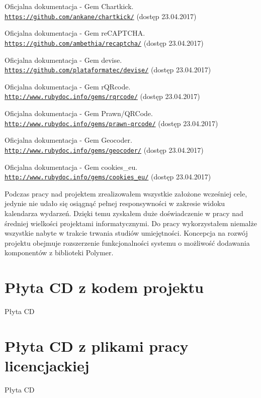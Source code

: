 \documentclass[openright]{xmgr}
\begin{document}
\begin{thebibliography}{9}
Oficjalna dokumentacja - Gem Chartkick.
\\\texttt{\url{https://github.com/ankane/chartkick/}} (dostęp 23.04.2017)

Oficjalna dokumentacja - Gem reCAPTCHA.
\\\texttt{\url{https://github.com/ambethia/recaptcha/}} (dostęp 23.04.2017)

Oficjalna dokumentacja - Gem devise.
\\\texttt{\url{https://github.com/plataformatec/devise/}} (dostęp 23.04.2017)

Oficjalna dokumentacja - Gem rQRcode.
\\\texttt{\url{http://www.rubydoc.info/gems/rqrcode/}} (dostęp 23.04.2017)

Oficjalna dokumentacja - Gem Prawn/QRCode.
\\\texttt{\url{http://www.rubydoc.info/gems/prawn-qrcode/}} (dostęp 23.04.2017)

Oficjalna dokumentacja - Gem Geocoder.
\\\texttt{\url{http://www.rubydoc.info/gems/geocoder/}} (dostęp 23.04.2017)

Oficjalna dokumentacja - Gem cookies\_eu.
\\\texttt{\url{http://www.rubydoc.info/gems/cookies_eu/}} (dostęp 23.04.2017)

\end{thebibliography} 


\summary
Podczas pracy nad projektem zrealizowałem wszystkie założone wcześniej cele, jedynie nie udało się osiągnąć pełnej responsywności w zakresie widoku kalendarza wydarzeń. Dzięki temu zyskałem duże doświadczenie w pracy nad średniej wielkości projektami informatycznymi. Do pracy wykorzystałem niemalże wszystkie nabyte w trakcie trwania studiów umiejętności. Koncepcja na rozwój projektu obejmuje rozszerzenie funkcjonalności systemu o możliwość dodawania komponentów z biblioteki Polymer. 

\appendix
\chapter{Płyta CD z kodem projektu}

Płyta CD

\chapter{Płyta CD z plikami pracy licencjackiej}

Płyta CD

\listoffigures

\lstlistoflistings
{}%

\oswiadczenie
\end{document}
